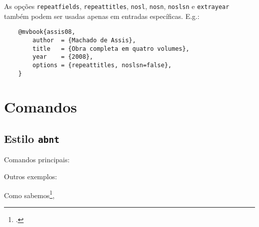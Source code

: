 \documentclass[a4paper]{article}
\begin{document}
As opções \texttt{repeatfields}, \texttt{repeattitles}, \texttt{nosl},
\texttt{nosn}, \texttt{noslsn} e \texttt{extrayear} também podem ser usadas apenas em entradas
específicas. E.g.:

\begin{verbatim}
    @mvbook{assis08,
        author  = {Machado de Assis},
        title   = {Obra completa em quatro volumes},
        year    = {2008},
        options = {repeattitles, noslsn=false},
    }
\end{verbatim}


\section{Comandos}%
\label{sec:comandos}

\subsection{Estilo \texttt{abnt}}%

Comandos principais:

\begin{example}
\cite{amaral15}
\end{example}

\begin{example}
\textcite{bosi08}
\end{example}

\begin{example}
\end{example}

\begin{example}
\cites{moretti09}{mann09}{amaral15}
\end{example}

\begin{example}
\textcites{moretti09}{mann09}{amaral15}
\end{example}

Outros exemplos:

\begin{example}
Como sabemos\footcite[Cf.][]{assis08},
\end{example}

\begin{example}
\end{example}

\begin{example}
\citeauthor{bosi08}
\end{example}
\end{document}
